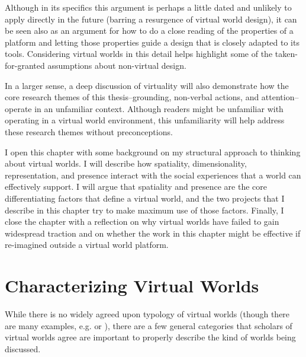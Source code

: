 Although in its specifics this argument is perhaps a little dated and unlikely to apply directly in the future (barring a resurgence of virtual world design), it can be seen also as an argument for how to do a close reading of the properties of a platform and letting those properties guide a design that is closely adapted to its tools. Considering virtual worlds in this detail helps highlight some of the taken-for-granted assumptions about non-virtual design.

In a larger sense, a deep discussion of virtuality will also demonstrate how the core research themes of this thesis--grounding, non-verbal actions, and attention--operate in an unfamiliar context. Although readers might be unfamiliar with operating in a virtual world environment, this unfamiliarity will help address these research themes without preconceptions.

I open this chapter with some background on my structural approach to thinking about virtual worlds. I will describe how spatiality, dimensionality, representation, and presence interact with the social experiences that a world can effectively support. I will argue that spatiality and presence are the core differentiating factors that define a virtual world, and the two projects that I describe in this chapter try to make maximum use of those factors. Finally, I close the chapter with a reflection on why virtual worlds have failed to gain widespread traction and on whether the work in this chapter might be effective if re-imagined outside a virtual world platform. 

% 
% 
% 
% 
% 
% 
% 
% 
% 
% 
% 


\section{Characterizing Virtual Worlds}

While there is no widely agreed upon typology of virtual worlds (though there are many examples, e.g. \citep{Koster:2007wg} or \citep{Bartle:2003up}), there are a few general categories that scholars of virtual worlds agree are important to properly describe the kind of worlds being discussed.

